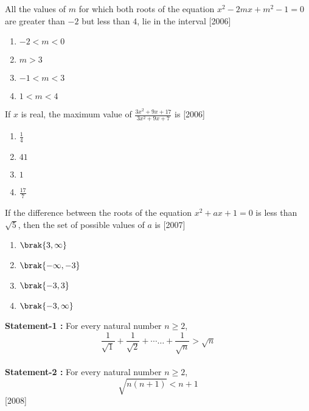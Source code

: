 \item All the values of $m$ for which both roots of the equation $x^2 - 2mx + m^2 - 1 = 0$ are greater than $-2$ but less than $4$, lie in the interval
\hfill[2006]

\begin{enumerate}

	\item  $-2 < m < 0$
	\item  $m > 3$
	\item  $-1 < m < 3$
	\item  $1 < m < 4$

\end{enumerate}

\item If $x$ is real, the maximum value of $\frac{3x^2 + 9x + 17}{3x^2 + 9x + 7}$ is
\hfill[2006]

\begin{enumerate}

	\item  $\frac{1}{4}$
	\item  $41$
	\item  $1$
	\item  $\frac{17}{7}$

\end{enumerate}

\item If the difference between the roots of the equation $x^2 + ax + 1 = 0$ is less than $\sqrt{5}$, then the set of possible values of $a$ is
\hfill[2007]

\begin{enumerate}

	\item  $\brak{3,\infty}$
	\item  $\brak{-\infty, -3}$
	\item  $\brak{-3, 3}$
	\item  $\brak{-3, \infty}$

\end{enumerate}

\item \textbf{Statement-1 :} For every natural number $n\geq 2$,\\
$$\frac{1}{\sqrt{1}} + \frac{1}{\sqrt{2}} + \cdots\dots + \frac{1}{\sqrt{n}} > \sqrt{n}$$\\
\textbf{Statement-2 :} For every natural number $n\geq 2$,\\
$$\sqrt{n(n + 1)} < n + 1$$
\hfill[2008]\\

